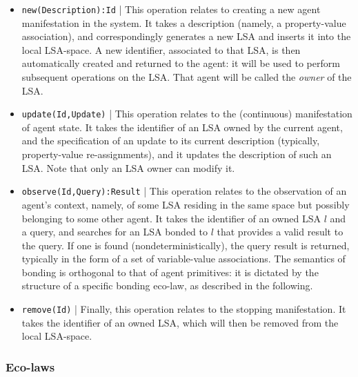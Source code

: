 \documentclass[12pt,a4paper,twoside,openright]{book}
\begin{document}
\begin{itemize}
 \item \texttt{new(Description):Id} | This operation relates to creating a new agent manifestation in the system. It takes a description (namely, a property-value association), and correspondingly generates a new LSA and inserts it into the local LSA-space. A new identifier, associated to that LSA, is then automatically created and returned to the agent: it will be used to perform subsequent operations on the LSA. That agent will be called the \emph{owner} of the LSA.
 
 \item \texttt{update(Id,Update)} | This operation relates to the (continuous) manifestation of agent state. It takes the identifier of an LSA owned by the current agent, and the specification of an update to its current description (typically, property-value re-assignments), and it updates the description of such an LSA. Note that only an LSA owner can modify it. 
 
 \item \texttt{observe(Id,Query):Result} | This operation relates to the  observation of an agent's context, namely, of some LSA residing in the same space but possibly belonging to some other agent. It takes the identifier of an owned LSA $l$ and a query, and searches for an LSA bonded to $l$ that provides a valid result to the query. If one is found (nondeterministically), the query result is returned, typically in the form of a set of variable-value associations. The semantics of bonding is orthogonal to that of agent primitives: it is dictated by the structure of a specific bonding eco-law, as described in the following. %
 
 \item \texttt{remove(Id)} | Finally, this operation relates to the stopping manifestation. It takes the identifier of an owned LSA, which will then be removed from the local LSA-space.
 
\end{itemize}

\subsubsection{Eco-laws}\label{s:ecolaws}
\end{document}
